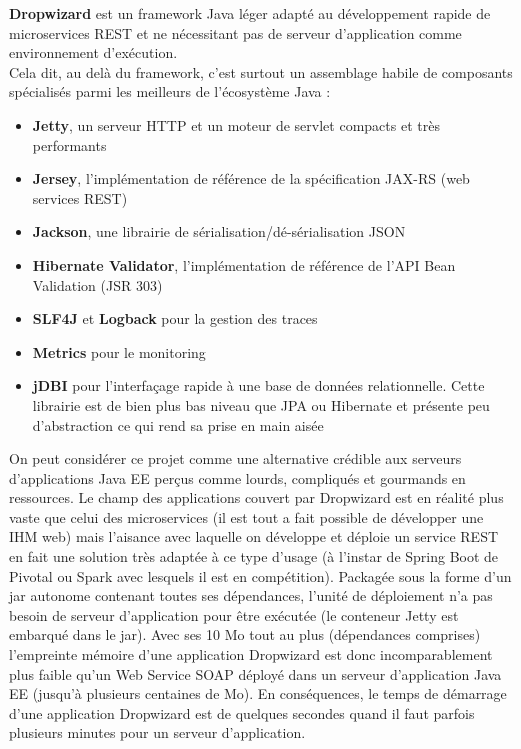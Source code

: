 \textbf{Dropwizard} est un framework Java léger adapté au développement rapide de microservices REST et ne nécessitant pas de serveur d’application comme environnement d’exécution. \\
Cela dit, au delà du framework, c’est surtout un assemblage habile de composants spécialisés parmi les meilleurs de l’écosystème Java :
\begin{itemize}
\item \textbf{Jetty}, un serveur HTTP et un moteur de servlet compacts et très performants 
\item \textbf{Jersey}, l’implémentation de référence de la spécification JAX-RS (web services REST) 
\item \textbf{Jackson}, une librairie de sérialisation/dé-sérialisation JSON 
\item \textbf{Hibernate Validator}, l’implémentation de référence de l’API Bean Validation (JSR 303) 
\item \textbf{SLF4J} et \textbf{Logback} pour la gestion des traces 
\item \textbf{Metrics} pour le monitoring 
\item \textbf{jDBI} pour l’interfaçage rapide à une base de données relationnelle. Cette librairie est de bien plus bas niveau que JPA ou Hibernate et présente peu d’abstraction ce qui rend sa prise en main aisée \\
\end{itemize}
On peut considérer ce projet comme une alternative crédible aux serveurs d’applications Java EE perçus comme lourds, compliqués et gourmands en ressources. Le champ des applications couvert par Dropwizard est en réalité plus vaste que celui des microservices (il est tout a fait possible de développer une IHM web) mais l’aisance avec laquelle on développe et déploie un service REST en fait une solution très adaptée à ce type d’usage (à l’instar de Spring Boot de Pivotal ou Spark avec lesquels il est en compétition).
Packagée sous la forme d’un jar autonome contenant toutes ses dépendances, l’unité de déploiement n’a pas besoin de serveur d’application pour être exécutée (le conteneur Jetty est embarqué dans le jar). Avec ses 10 Mo tout au plus (dépendances comprises) l’empreinte mémoire d’une application Dropwizard est donc incomparablement plus faible qu’un Web Service SOAP déployé dans un serveur d’application Java EE (jusqu’à plusieurs centaines de Mo).
En conséquences, le temps de démarrage d’une application Dropwizard est de quelques secondes quand il faut parfois plusieurs minutes pour un serveur d’application.\\

